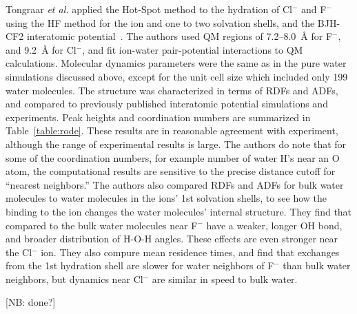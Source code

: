 \documentclass[11pt]{revtex4}
\begin{document}
Tongraar {\it et al.} applied the Hot-Spot method to the
hydration of Cl$^-$ and F$^-$ using the HF method for the
ion and one to two solvation shells, and the BJH-CF2 interatomic
potential~\cite{tongraar_phys_chem_chem_phys_2003a,tongraar_chem_phys_lett_2005a}.
The authors used QM regions of 7.2--8.0~{\AA} for F$^-$, and 9.2~{\AA} for
Cl$^-$, and fit ion-water pair-potential interactions to QM calculations.
Molecular dynamics parameters were the same as in the pure water
simulations discussed above, except for the unit cell size which included
only 199 water molecules.  The structure was characterized in terms of
RDFs and ADFs, and compared to previously published interatomic potential
simulations and experiments.  Peak heights and coordination numbers are
summarized in Table~\ref{table:rode}.  These results are in reasonable
agreement with experiment, although the range of experimental results
is large.  The authors do note that for some of the coordination numbers,
for example number of water H's near an O atom, the computational results
are sensitive to the precise distance cutoff for ``nearest neighbors.''
The authors also compared RDFs and ADFs for bulk water molecules to water
molecules in the ions' 1st solvation shells, to see how the binding to
the ion changes the water molecules' internal structure.   They find that
compared to the bulk water molecules near F$^-$ have a weaker, longer OH
bond, and broader distribution of H-O-H angles.  These effects are even
stronger near the Cl$^-$ ion.  They also compure mean residence times,
and find that exchanges from the 1st hydration shell are slower for water
neighbors of F$^-$ than bulk water neighbors, but dynamics near Cl$^-$
are similar in speed to bulk water.

[NB: done?]

 
\end{document}
